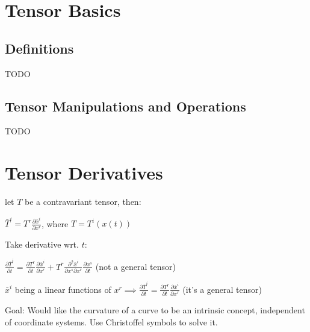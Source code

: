 \documentclass[8pt,letter]{article}
\begin{document}


\begin{multicols*}{2}

  \section{Tensor Basics}

  \subsection{Definitions}
  TODO

  \subsection{Tensor Manipulations and Operations}
  TODO

  \vfill\null
  \pagebreak
    
  \section{Tensor Derivatives}
  
  let $T$ be a contravariant tensor, then:

  $\bar{T}^i = T^r \frac{\partial \bar{x}^i}{\partial x^r}$, where $T=T^i(x(t))$

  Take derivative wrt. $t$:

  $\frac{\partial \bar{T}^i}{\partial t} = \frac{\partial T^r}{\partial t} \frac{\partial \bar{x}^i}{\partial x^r} + T^r \frac{\partial^2 \bar{x}^i}{\partial x^s \partial x^r} \frac{\partial x^s}{\partial t}$ (not a general tensor)

  $\bar{x}^i$ being a linear functions of $x^r \implies \frac{\partial \bar{T}^i}{\partial t} = \frac{\partial T^r}{\partial t} \frac{\partial \bar{x}^i}{\partial x^r}$ (it's a general tensor)
  
  Goal: Would like the curvature of a curve to be an intrinsic concept, independent of coordinate systems. Use Christoffel symbols to solve it.


\end{multicols*}
\end{document}
